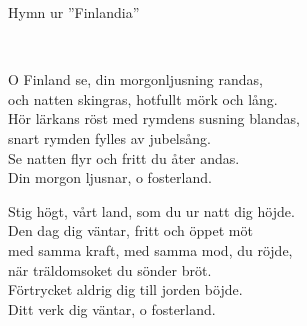 \begin{song}{Hymn ur ''Finlandia''}
	
	
	\\
	
	O Finland se, din morgonljusning randas,\\
	och natten skingras, hotfullt mörk och lång.\\
	Hör lärkans röst med rymdens susning blandas,\\
	snart rymden fylles av jubelsång.\\
	Se natten flyr och fritt du åter andas.\\
	Din morgon ljusnar, o fosterland.
	
	Stig högt, vårt land, som du ur natt dig höjde.\\
	Den dag dig väntar, fritt och öppet möt\\
	med samma kraft, med samma mod, du röjde,\\
	när träldomsoket du sönder bröt.\\
	Förtrycket aldrig dig till jorden böjde.\\
	Ditt verk dig väntar, o fosterland.
	
\end{song}
